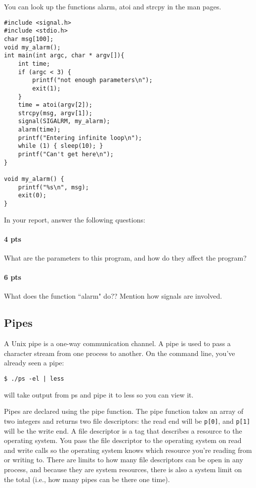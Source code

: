 \documentclass[letterpaper,10pt]{article}
\begin{document}
You can look up the functions alarm, atoi and strcpy in the man pages.

\begin{verbatim}
#include <signal.h>
#include <stdio.h>
char msg[100];
void my_alarm();
int main(int argc, char * argv[]){
    int time;
    if (argc < 3) {
        printf("not enough parameters\n");
        exit(1);
    }
    time = atoi(argv[2]);
    strcpy(msg, argv[1]);
    signal(SIGALRM, my_alarm);
    alarm(time);
    printf("Entering infinite loop\n");
    while (1) { sleep(10); }
    printf("Can't get here\n");
}

void my_alarm() {
    printf("%s\n", msg);
    exit(0);
}
\end{verbatim}

In your report, answer the following questions:
\paragraph{4 pts} What are the parameters to this program, and how do they affect the program?
\paragraph{6 pts} What does the function ``alarm" do?? Mention how signals are involved.

\subsection{Pipes}
A Unix pipe is a one-way communication channel. A pipe is used to pass a character stream from one
process to another. On the command line, you’ve already seen a pipe:
\begin{verbatim}
$ ./ps -el | less
\end{verbatim}
will take output from ps and pipe it to less so you can view it.

Pipes are declared using the pipe function. The pipe function takes an array of two integers and returns
two file descriptors: the read end will be \verb+p[0]+, and \verb+p[1]+ will be the write end. A file descriptor is a tag
that describes a resource to the operating system. You pass the file descriptor to the operating system on
read and write calls so the operating system knows which resource you're reading from or writing to.
There are limits to how many file descriptors can be open in any process, and because they are system resources,
there is also a system limit on the total (i.e., how many pipes can be there one time). 
\end{document}
